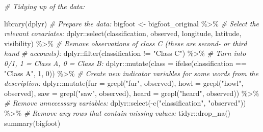 \documentclass[
]{article}
\newenvironment{Shaded}{\begin{snugshade}}{\end{snugshade}}
\newcommand{\AttributeTok}[1]{\textcolor[rgb]{0.77,0.63,0.00}{#1}}
\newcommand{\CommentTok}[1]{\textcolor[rgb]{0.56,0.35,0.01}{\textit{#1}}}
\newcommand{\DecValTok}[1]{\textcolor[rgb]{0.00,0.00,0.81}{#1}}
\newcommand{\FunctionTok}[1]{\textcolor[rgb]{0.00,0.00,0.00}{#1}}
\newcommand{\NormalTok}[1]{#1}
\newcommand{\OtherTok}[1]{\textcolor[rgb]{0.56,0.35,0.01}{#1}}
\newcommand{\SpecialCharTok}[1]{\textcolor[rgb]{0.00,0.00,0.00}{#1}}
\newcommand{\StringTok}[1]{\textcolor[rgb]{0.31,0.60,0.02}{#1}}
\begin{document}
\begin{Shaded}
\begin{Highlighting}[]
\CommentTok{\# Tidying up of the data:}

\FunctionTok{library}\NormalTok{(dplyr)}
\CommentTok{\# Prepare the data:}
\NormalTok{bigfoot }\OtherTok{\textless{}{-}}\NormalTok{ bigfoot\_original }\SpecialCharTok{\%\textgreater{}\%}
    \CommentTok{\# Select the relevant covariates:}
\NormalTok{dplyr}\SpecialCharTok{::}\FunctionTok{select}\NormalTok{(classification, observed, longitude, latitude, visibility) }\SpecialCharTok{\%\textgreater{}\%}
    \CommentTok{\# Remove observations of class C (these are second{-} or third hand}
    \CommentTok{\# accounts):}
\NormalTok{dplyr}\SpecialCharTok{::}\FunctionTok{filter}\NormalTok{(classification }\SpecialCharTok{!=} \StringTok{"Class C"}\NormalTok{) }\SpecialCharTok{\%\textgreater{}\%}
    \CommentTok{\# Turn into 0/1, 1 = Class A, 0 = Class B:}
\NormalTok{dplyr}\SpecialCharTok{::}\FunctionTok{mutate}\NormalTok{(}\AttributeTok{class =} \FunctionTok{ifelse}\NormalTok{(classification }\SpecialCharTok{==} \StringTok{"Class A"}\NormalTok{, }\DecValTok{1}\NormalTok{, }\DecValTok{0}\NormalTok{)) }\SpecialCharTok{\%\textgreater{}\%}
    \CommentTok{\# Create new indicator variables for some words from the description:}
\NormalTok{dplyr}\SpecialCharTok{::}\FunctionTok{mutate}\NormalTok{(}\AttributeTok{fur =} \FunctionTok{grepl}\NormalTok{(}\StringTok{"fur"}\NormalTok{, observed), }\AttributeTok{howl =} \FunctionTok{grepl}\NormalTok{(}\StringTok{"howl"}\NormalTok{, observed), }\AttributeTok{saw =} \FunctionTok{grepl}\NormalTok{(}\StringTok{"saw"}\NormalTok{,}
\NormalTok{    observed), }\AttributeTok{heard =} \FunctionTok{grepl}\NormalTok{(}\StringTok{"heard"}\NormalTok{, observed)) }\SpecialCharTok{\%\textgreater{}\%}
    \CommentTok{\# Remove unnecessary variables:}
\NormalTok{dplyr}\SpecialCharTok{::}\FunctionTok{select}\NormalTok{(}\SpecialCharTok{{-}}\FunctionTok{c}\NormalTok{(}\StringTok{"classification"}\NormalTok{, }\StringTok{"observed"}\NormalTok{)) }\SpecialCharTok{\%\textgreater{}\%}
    \CommentTok{\# Remove any rows that contain missing values:}
\NormalTok{tidyr}\SpecialCharTok{::}\FunctionTok{drop\_na}\NormalTok{()}
\FunctionTok{summary}\NormalTok{(bigfoot)}
\end{Highlighting}
\end{Shaded}
\end{document}
